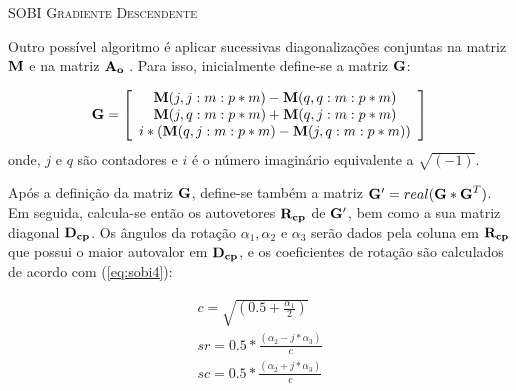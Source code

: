 \documentclass[a4paper,12pt]{monografia}
\theoremstyle{plain}
\theoremstyle{definition}
\theoremstyle{remark}
\begin{document}
 \begin{algorithm}[h]
   \SetAlgoLined
   \label{alg2}
   \caption{\textsc{SOBI Gradiente Descendente}}
 \end{algorithm}
 
 Outro possível algoritmo é aplicar sucessivas diagonalizações conjuntas na matriz ${\bf M}$ e na matriz ${\bf A_{o}}$ \cite{belouchrani1993second,belouchrani2000robust}. Para isso, inicialmente define-se a matriz ${\bf G}$:
 
 \begin{equation}
      {\bf G} = \left[
        \begin{array}{c}
            {\bf M}(j,j:m:p*m)-{\bf M}(q,q:m:p*m)  \\
            {\bf M}(j,q:m:p*m)+{\bf M}(q,j:m:p*m)  \\
            i*({\bf M}(q,j:m:p*m)-{\bf M}(j,q:m:p*m))
        \end{array}
        \right]
    \label{eq:sobi3}
\end{equation}
 onde, $j$ e $q$ são contadores e $i$ é o número imaginário equivalente a $\sqrt{(-1)}$.
 
 Após a definição da matriz ${\bf G}$, define-se também a matriz ${\bf G'}=real( {\bf G*G}^{T})$. Em seguida, calcula-se então os autovetores  ${\bf R_{cp}}$ de ${\bf G'}$, bem como a sua matriz diagonal ${\bf D_{cp}}$. Os ângulos da rotação $\alpha_{1}, \alpha_{2}$ e $\alpha_{3}$ serão dados pela coluna em ${\bf R_{cp}}$ que possui o maior autovalor em ${\bf D_{cp}}$, e os coeficientes de rotação são calculados de acordo com (\ref{eq:sobi4}):

\begin{equation}
    \begin{array}{c}
        c=\sqrt{(0.5+\frac{\alpha_{1}}{2})} \\
        sr=0.5*\frac{(\alpha_{2}-j*\alpha_{3})}{c}\\
        sc=0.5*\frac{(\alpha_{2}+j*\alpha_{3})}{c}
    \end{array}
    \label{eq:sobi4}
\end{equation}
\end{document}

